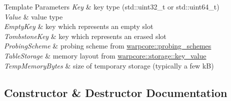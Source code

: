 \begin{DoxyTemplParams}{Template Parameters}
{\em Key} & key type ({\ttfamily std\+::uint32\+\_\+t} or {\ttfamily std\+::uint64\+\_\+t}) \\
\hline
{\em Value} & value type \\
\hline
{\em Empty\+Key} & key which represents an empty slot \\
\hline
{\em Tombstone\+Key} & key which represents an erased slot \\
\hline
{\em Probing\+Scheme} & probing scheme from {\ttfamily \hyperlink{namespacewarpcore_1_1probing__schemes}{warpcore\+::probing\+\_\+schemes}} \\
\hline
{\em Table\+Storage} & memory layout from {\ttfamily \hyperlink{namespacewarpcore_1_1storage_1_1key__value}{warpcore\+::storage\+::key\+\_\+value}} \\
\hline
{\em Temp\+Memory\+Bytes} & size of temporary storage (typically a few kB) \\
\hline
\end{DoxyTemplParams}


\subsection{Constructor \& Destructor Documentation}
\mbox{\label{classwarpcore_1_1SingleValueHashTable_a7cb8b01ed6c2ceee8118e398eb4dde83}} 
